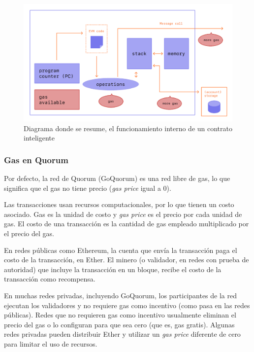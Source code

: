         \begin{figure}
          \centering
          \includegraphics[scale=0.4]{Graphics/gas.png}
          \caption{Diagrama donde se resume, el funcionamiento interno de un contrato inteligente}
          \label{gas_auctionEnd}
        \end{figure}

        \subsubsection{Gas en Quorum}
        Por defecto, la red de Quorum (GoQuorum) es una red libre de gas, lo que significa que el gas no 
        tiene precio (\textit{gas price} igual a 0).


        Las transacciones usan recursos computacionales, por lo que tienen un costo asociado.
        Gas es la unidad de costo y \textit{gas price} es el precio por cada unidad de gas. El costo de
        una transacción es la cantidad de gas empleado multiplicado por el precio del gas. 
        
        En redes públicas como Ethereum, la cuenta que envía la transacción paga el costo de la transacción,
        en Ether. El minero (o validador, en redes con prueba de autoridad) que incluye la 
        transacción en un bloque, recibe el costo de la transacción como recompensa.


        En muchas redes privadas, incluyendo GoQuorum, los participantes de la red ejecutan los 
        validadores y no requiere gas como incentivo (como pasa en las redes públicas). Redes que no 
        requieren gas como incentivo usualmente eliminan el precio del gas o lo configuran para que sea cero
        (que es, gas gratis). Algunas redes privadas pueden distribuir Ether y utilizar un \textit{gas price}
        diferente de cero para limitar el uso de recursos.


